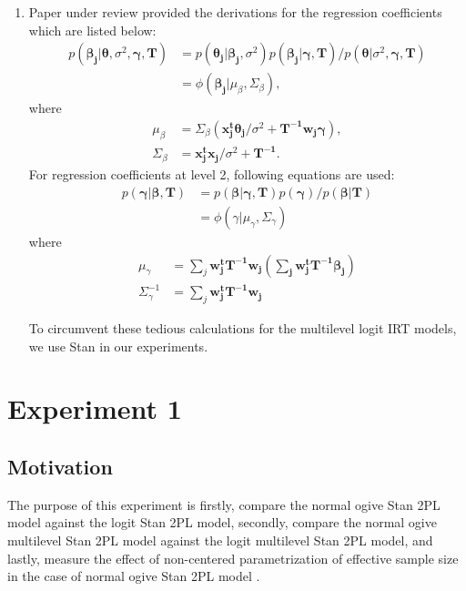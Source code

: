 \documentclass[12pt]{article}
\begin{document}
\begin{enumerate}
    \item Paper under review \cite{fox2001bayesian} provided the derivations for the regression coefficients which are listed below:
    \begin{align*}
        p(\boldsymbol{\beta_j|\theta,} \sigma^2, \boldsymbol{\gamma, T}) & = 
        p(\boldsymbol{\theta_j|\beta_j}, \sigma^2)p(\boldsymbol{\beta_j|\gamma, T})/p(\boldsymbol{\theta}|\sigma^2,\boldsymbol{\gamma, T})\\
        & = \phi(\boldsymbol{\beta_j}|\mu_\beta, \Sigma_\beta),
    \end{align*} where
    \begin{align*}
        \mu_\beta & = \Sigma_\beta(\boldsymbol{x_j^t\theta_j}/\sigma^2 + \boldsymbol{T^{-1}w_j\gamma}),\\
        \Sigma_\beta & = \boldsymbol{x_j^tx_j}/\sigma^2 + \boldsymbol{T^{-1}}.
    \end{align*}
    For regression coefficients at level 2, following equations are used:
    \begin{align*}
        p(\boldsymbol{\gamma|\beta, T}) & = 
        p(\boldsymbol{\beta|\gamma, T})p(\boldsymbol{\gamma})/p(\boldsymbol{\beta|T})\\
        & = \phi(\gamma|\mu_\gamma, \Sigma_\gamma)
    \end{align*} where
    \begin{align*}
        \mu_\gamma & = \sum_j \boldsymbol{w^t_jT^{-1}w_j(\sum_j \boldsymbol{w^t_jT^{-1}\beta_j})}\\
        \Sigma^{-1}_\gamma & = \sum_j \boldsymbol{w^t_jT^{-1}w_j}
    \end{align*}
    
    
To circumvent these tedious calculations for the multilevel logit IRT models, we use Stan in our experiments.
\end{enumerate} 

\section{Experiment 1}
\subsection{Motivation}
The purpose of this experiment is firstly, compare the normal ogive Stan 2PL model against the logit Stan 2PL model, secondly, compare the normal ogive multilevel Stan 2PL model against the logit multilevel Stan 2PL model, and lastly, measure the effect of non-centered parametrization of effective sample size in the case of normal ogive Stan 2PL model \cite{papaspiliopoulos2007general}. 
\end{document}

